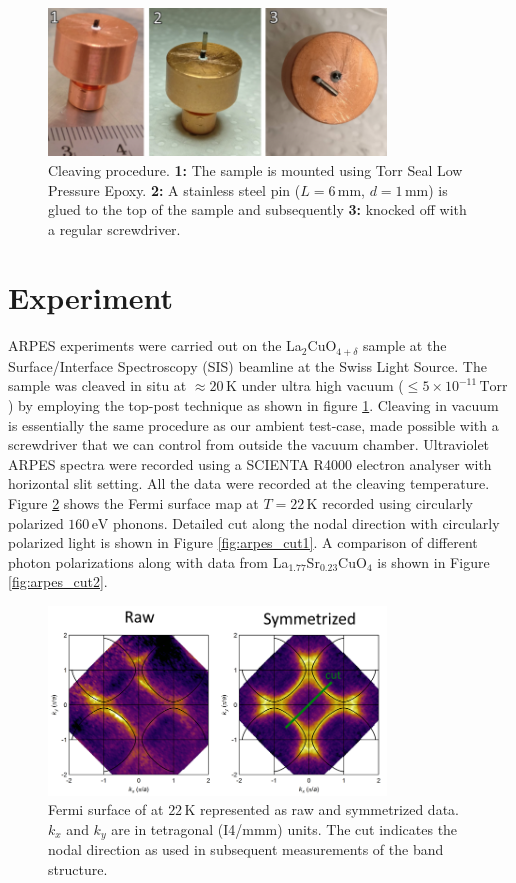 \begin{figure}
    \centering
    \includegraphics[width=0.8\textwidth]{fig/arpes/cleave.png}
    \caption{Cleaving procedure. \textbf{1:} The sample is mounted using Torr Seal Low Pressure Epoxy. \textbf{2:} A stainless steel pin ($L=6\,\text{mm}$, $d=1\,\text{mm}$) is glued to the top of the sample and subsequently \textbf{3:} knocked off with a regular screwdriver.}
    \label{fig:arpes_cleave}
\end{figure}


\section{Experiment}
ARPES experiments were carried out on the La$_2$CuO$_{4+\delta}$ sample at the Surface/Interface Spectroscopy (SIS) beamline at the Swiss Light Source. The sample was cleaved in situ at $\approx 20\,\text{K}$ under ultra high vacuum ($\leq 5 \times 10^{-11}\,\text{Torr}$) by employing the top-post technique as shown in figure \ref{fig:arpes_cleave}. Cleaving in vacuum is essentially the same procedure as our ambient test-case, made possible with a screwdriver that we can control from outside the vacuum chamber. Ultraviolet ARPES spectra were recorded using a SCIENTA R4000 electron analyser with horizontal slit setting. All the data were recorded at the cleaving temperature. Figure \ref{fig:arpes_fs} shows the Fermi surface map at $T=22\,\text{K}$ recorded using circularly polarized $160\,\text{eV}$ phonons. Detailed cut along the nodal direction with circularly polarized light is shown in Figure \ref{fig:arpes_cut1}. A comparison of different photon polarizations along with data from La$_{1.77}$Sr$_{0.23}$CuO$_4$ is shown in Figure \ref{fig:arpes_cut2}.

\begin{figure}
    \centering
    \includegraphics[width=0.8\textwidth]{fig/arpes/fermi_surface.png}
    \caption{Fermi surface of at $22\,\text{K}$ represented as raw and symmetrized data. $k_x$ and $k_y$ are in tetragonal (I4/mmm) units. The cut indicates the nodal direction as used in subsequent measurements of the band structure.}
    \label{fig:arpes_fs}
\end{figure}

